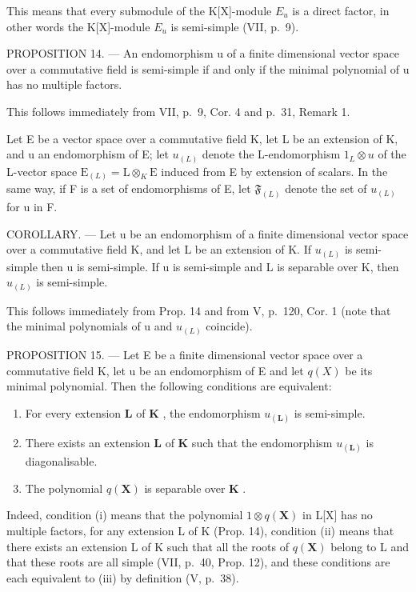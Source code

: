This means that every submodule of the K{[}X{]}-module \(E_{u}\) is a direct factor, in other words the K{[}X{]}-module \(E_{u}\) is semi-simple (VII, p.~9).

PROPOSITION 14. --- An endomorphism u of a finite dimensional vector space over a commutative field is semi-simple if and only if the minimal polynomial of u has no multiple factors.

This follows immediately from VII, p.~9, Cor. 4 and p.~31, Remark 1.

Let E be a vector space over a commutative field K, let L be an extension of K, and u an endomorphism of E; let \(u_{(L)}\) denote the L-endomorphism \(1_{L} \otimes u\) of the L-vector space \(\mathrm{E}_{(L)} = \mathrm{L} \otimes_{K} \mathrm{E}\) induced from E by extension of scalars. In the same way, if F is a set of endomorphisms of E, let \(\mathfrak{F}_{(L)}\) denote the set of \(u_{(L)}\) for u in F.

COROLLARY. --- Let u be an endomorphism of a finite dimensional vector space over a commutative field K, and let L be an extension of K. If \(u_{(L)}\) is semi-simple then u is semi-simple. If u is semi-simple and L is separable over K, then \(u_{(L)}\) is semi-simple.

This follows immediately from Prop. 14 and from V, p.~120, Cor. 1 (note that the minimal polynomials of u and \(u_{(L)}\) coincide).

PROPOSITION 15. --- Let E be a finite dimensional vector space over a commutative field K, let u be an endomorphism of E and let \(q(X)\) be its minimal polynomial. Then the following conditions are equivalent:

\begin{enumerate}
\def\labelenumi{(\roman{enumi})}
\item
  For every extension \(\mathbf{L}\) of \(\mathbf{K}\) , the endomorphism \(u_{(\mathbf{L})}\) is semi-simple.
\item
  There exists an extension \(\mathbf{L}\) of \(\mathbf{K}\) such that the endomorphism \(u_{(\mathbf{L})}\) is diagonalisable.
\item
  The polynomial \(q(\mathbf{X})\) is separable over \(\mathbf{K}\) .
\end{enumerate}

Indeed, condition (i) means that the polynomial \(1 \otimes q(\mathbf{X})\) in L{[}X{]} has no multiple factors, for any extension L of K (Prop. 14), condition (ii) means that there exists an extension L of K such that all the roots of \(q(\mathbf{X})\) belong to L and that these roots are all simple (VII, p.~40, Prop. 12), and these conditions are each equivalent to (iii) by definition (V, p.~38).

